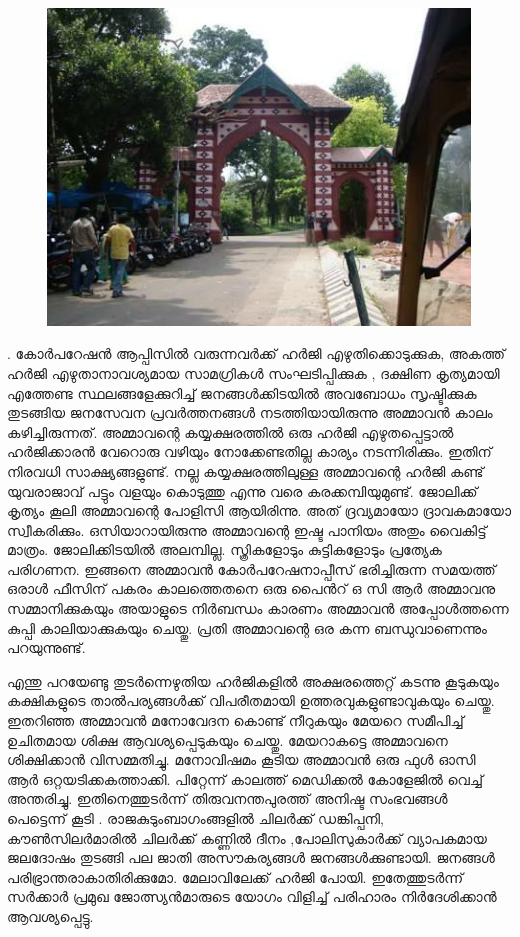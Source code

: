 \documentclass[10pt,a4paper]{report}
\begin{document}
    \begin{figure}[H]
  \center
\includegraphics[scale=.45]{images/nada}
\label{nada}
\caption{   }
\end{figure}
  
  . കോർപറേഷൻ ആപ്പിസിൽ വരുന്നവർക്ക് ഹർജി എഴുതിക്കൊടുക്കുക, അകത്ത് ഹർജി എഴുതാനാവശ്യമായ സാമഗ്രികൾ സംഘടിപ്പിക്കുക , ദക്ഷിണ കൃത്യമായി എത്തേണ്ട സ്ഥലങ്ങളേക്കുറിച്ച് ജനങ്ങൾക്കിടയിൽ അവബോധം സൃഷ്ടിക്കുക തുടങ്ങിയ ജനസേവന പ്രവർത്തനങ്ങൾ നടത്തിയായിരുന്നു അമ്മാവൻ കാലം കഴിച്ചിരുന്നത്. അമ്മാവന്റെ കയ്യക്ഷരത്തിൽ ഒരു ഹർജി എഴുതപ്പെട്ടാൽ ഹർജിക്കാരൻ വേറൊരു വഴിയും നോക്കേണ്ടതില്ല കാര്യം നടന്നിരിക്കും. ഇതിന് നിരവധി സാക്ഷ്യങ്ങളുണ്ട്. നല്ല കയ്യക്ഷരത്തിലുള്ള അമ്മാവന്റെ ഹർജി കണ്ട് യുവരാജാവ് പട്ടും വളയും കൊടുത്തു എന്നു വരെ കരക്കമ്പിയുമുണ്ട്. ജോലിക്ക് കൃത്യം കൂലി അമ്മാവന്റെ പോളിസി ആയിരിന്നു. അത് ദ്രവ്യമായോ ദ്രാവകമായോ സ്വീകരിക്കും. ഒസിയാറായിരുന്നു അമ്മാവന്റെ ഇഷ്ട പാനിയം അതും വൈകിട്ട് മാത്രം. ജോലിക്കിടയിൽ അലമ്പില്ല. സ്ത്രികളോടും കുട്ടികളോടും പ്രത്യേക പരിഗണന. ഇങ്ങനെ അമ്മാവൻ കോർപറേഷനാപ്പീസ് ഭരിച്ചിരുന്ന സമയത്ത് ഒരാൾ ഫീസിന് പകരം കാലത്തെതനെ ഒരു പൈൻറ് ഒ സി ആർ അമ്മാവനു സമ്മാനിക്കുകയും അയാളുടെ നിർബന്ധം കാരണം അമ്മാവൻ അപ്പോൾത്തന്നെ കുപ്പി കാലിയാക്കുകയും ചെയ്തു. പ്രതി അമ്മാവന്റെ ഒര കന്ന ബന്ധുവാണെന്നും പറയുന്നുണ്ട്. 
  
  എന്തു പറയേണ്ടു തുടർന്നെഴുതിയ ഹർജികളിൽ അക്ഷരത്തെറ്റ് കടന്നു കൂടുകയും കക്ഷികളുടെ താൽപര്യങ്ങൾക്ക് വിപരീതമായി ഉത്തരവുകളുണ്ടാവുകയും ചെയ്തു. ഇതറിഞ്ഞ അമ്മാവൻ മനോവേദന കൊണ്ട് നീറുകയും മേയറെ സമീപിച്ച് ഉചിതമായ ശിക്ഷ ആവശ്യപ്പെടുകയും ചെയ്തു. മേയറാകട്ടെ അമ്മാവനെ ശിക്ഷിക്കാൻ വിസമ്മതിച്ചു. മനോവിഷമം കൂടിയ അമ്മാവൻ ഒരു ഫുൾ ഓസി ആർ ഒറ്റയടിക്കകത്താക്കി. പിറ്റേന്ന് കാലത്ത് മെഡിക്കൽ കോളേജിൽ വെച്ച് അന്തരിച്ചു. ഇതിനെത്തുടർന്ന് തിരുവനന്തപുരത്ത് അനിഷ്ട സംഭവങ്ങൾ പെട്ടെന്ന് കൂടി . രാജകുടുംബാഗംങ്ങളിൽ ചിലർക്ക് ഡങ്കിപ്പനി, കൗൺസിലർമാരിൽ ചിലർക്ക് കണ്ണിൽ ദീനം ,പോലിസുകാർക്ക് വ്യാപകമായ ജലദോഷം തുടങ്ങി പല ജാതി അസൗകര്യങ്ങൾ ജനങ്ങൾക്കുണ്ടായി. ജനങ്ങൾ പരിഭ്രാന്തരാകാതിരിക്കുമോ. മേലാവിലേക്ക് ഹർജി പോയി. ഇതേത്തുടർന്ന് സർക്കാർ പ്രമുഖ ജോത്സ്യൻമാരുടെ യോഗം വിളിച്ച് പരിഹാരം നിർദേശിക്കാൻ ആവശ്യപ്പെട്ടു.
  
\end{document}
